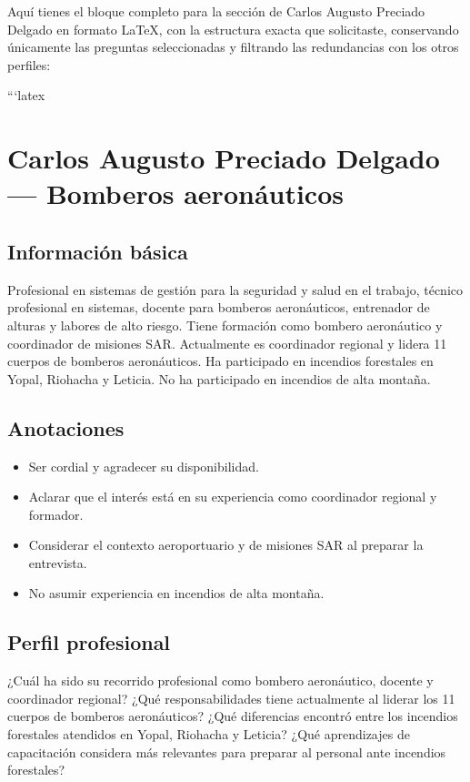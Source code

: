 Aquí tienes el bloque completo para la sección de Carlos Augusto Preciado Delgado en formato LaTeX, con la estructura exacta que solicitaste, conservando únicamente las preguntas seleccionadas y filtrando las redundancias con los otros perfiles:

```latex
\section{Carlos Augusto Preciado Delgado --- Bomberos aeronáuticos}

\subsection{Información básica}
Profesional en sistemas de gestión para la seguridad y salud en el trabajo, técnico profesional en sistemas, docente para bomberos aeronáuticos, entrenador de alturas y labores de alto riesgo. Tiene formación como bombero aeronáutico y coordinador de misiones SAR. Actualmente es coordinador regional y lidera 11 cuerpos de bomberos aeronáuticos. Ha participado en incendios forestales en Yopal, Riohacha y Leticia. No ha participado en incendios de alta montaña.

\subsection{Anotaciones}
\begin{itemize}
  \item Ser cordial y agradecer su disponibilidad.
  \item Aclarar que el interés está en su experiencia como coordinador regional y formador.
  \item Considerar el contexto aeroportuario y de misiones SAR al preparar la entrevista.
  \item No asumir experiencia en incendios de alta montaña.
\end{itemize}

\subsection{Perfil profesional}
\begin{enumerate}
  \pregunta ¿Cuál ha sido su recorrido profesional como bombero aeronáutico, docente y coordinador regional?
  \pregunta ¿Qué responsabilidades tiene actualmente al liderar los 11 cuerpos de bomberos aeronáuticos?
  \pregunta ¿Qué diferencias encontró entre los incendios forestales atendidos en Yopal, Riohacha y Leticia?
  \pregunta ¿Qué aprendizajes de capacitación considera más relevantes para preparar al personal ante incendios forestales?
\end{enumerate}

